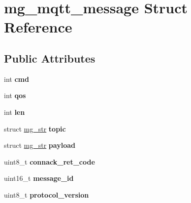 \hypertarget{structmg__mqtt__message}{}\section{mg\+\_\+mqtt\+\_\+message Struct Reference}
\label{structmg__mqtt__message}
\subsection*{Public Attributes}
\begin{DoxyCompactItemize}
\item 
\mbox{\label{structmg__mqtt__message_abfc247fa4aaf411b0957e71df6f6ce2b}} 
int {\bfseries cmd}
\item 
\mbox{\label{structmg__mqtt__message_a5c5bca3da240c7a3cbc7bef8b67bc90e}} 
int {\bfseries qos}
\item 
\mbox{\label{structmg__mqtt__message_a5ac9625e8214e6a3ac6c835f19b3a9c8}} 
int {\bfseries len}
\item 
\mbox{\label{structmg__mqtt__message_ac121d4016c13ad0387409feee1ebc666}} 
struct \hyperlink{structmg__str}{mg\+\_\+str} {\bfseries topic}
\item 
\mbox{\label{structmg__mqtt__message_a12215d63bfcd1341849add871ef0efc7}} 
struct \hyperlink{structmg__str}{mg\+\_\+str} {\bfseries payload}
\item 
\mbox{\label{structmg__mqtt__message_a4a6ff07b1d3fb2f06de4422d13e8e1ec}} 
uint8\+\_\+t {\bfseries connack\+\_\+ret\+\_\+code}
\item 
\mbox{\label{structmg__mqtt__message_aa62fb03efa898fe46058b34e6031f8db}} 
uint16\+\_\+t {\bfseries message\+\_\+id}
\item 
\mbox{\label{structmg__mqtt__message_a28adc3153ad7cca48588a73297dff2b4}} 
uint8\+\_\+t {\bfseries protocol\+\_\+version}
\item 
\mbox{\label{structmg__mqtt__message_a74388e94b78a4aed9260dc2c4d4da5da}} 

\end{DoxyCompactItemize}
